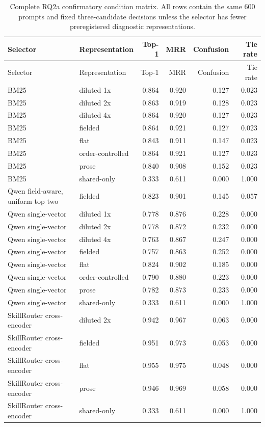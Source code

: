 {\scriptsize
\setlength{\tabcolsep}{2pt}
\begin{longtable}{@{}p{}p{}rrrr@{}}
\caption{Complete RQ2a confirmatory condition matrix. All rows contain the same 600 prompts and fixed three-candidate decisions unless the selector has fewer preregistered diagnostic representations.}
\label{tab:rq2a-full-condition-matrix}\\
\toprule
Selector & Representation & Top-1 & MRR & Confusion & Tie rate \\
\midrule
\endfirsthead
\toprule
Selector & Representation & Top-1 & MRR & Confusion & Tie rate \\
\midrule
\endhead
\bottomrule
\endfoot
BM25 & diluted 1x & 0.864 & 0.920 & 0.127 & 0.023 \\
BM25 & diluted 2x & 0.863 & 0.919 & 0.128 & 0.023 \\
BM25 & diluted 4x & 0.864 & 0.920 & 0.127 & 0.023 \\
BM25 & fielded & 0.864 & 0.921 & 0.127 & 0.023 \\
BM25 & flat & 0.843 & 0.911 & 0.147 & 0.023 \\
BM25 & order-controlled & 0.864 & 0.921 & 0.127 & 0.023 \\
BM25 & prose & 0.840 & 0.908 & 0.152 & 0.023 \\
BM25 & shared-only & 0.333 & 0.611 & 0.000 & 1.000 \\
Qwen field-aware, uniform top two & fielded & 0.823 & 0.901 & 0.145 & 0.057 \\
Qwen single-vector & diluted 1x & 0.778 & 0.876 & 0.228 & 0.000 \\
Qwen single-vector & diluted 2x & 0.778 & 0.872 & 0.232 & 0.000 \\
Qwen single-vector & diluted 4x & 0.763 & 0.867 & 0.247 & 0.000 \\
Qwen single-vector & fielded & 0.757 & 0.863 & 0.252 & 0.000 \\
Qwen single-vector & flat & 0.824 & 0.902 & 0.185 & 0.000 \\
Qwen single-vector & order-controlled & 0.790 & 0.880 & 0.223 & 0.000 \\
Qwen single-vector & prose & 0.782 & 0.873 & 0.233 & 0.000 \\
Qwen single-vector & shared-only & 0.333 & 0.611 & 0.000 & 1.000 \\
SkillRouter cross-encoder & diluted 2x & 0.942 & 0.967 & 0.063 & 0.000 \\
SkillRouter cross-encoder & fielded & 0.951 & 0.973 & 0.053 & 0.000 \\
SkillRouter cross-encoder & flat & 0.955 & 0.975 & 0.048 & 0.000 \\
SkillRouter cross-encoder & prose & 0.946 & 0.969 & 0.058 & 0.000 \\
SkillRouter cross-encoder & shared-only & 0.333 & 0.611 & 0.000 & 1.000 \\
\end{longtable}
}

